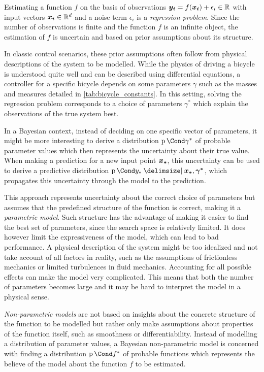 Estimating a function $f$ on the basis of observations $\bm{y_i} = f(\bm{x_i}) + \epsilon_i \in \mathbb{R}$ with input vectors $\bm{x_i} \in \mathbb{R}^d$ and a noise term $\epsilon_i$ is a \emph{regression problem}.
Since the number of observations is finite and the function $f$ is an infinite object, the estimation of $f$ is uncertain and based on prior assumptions about its structure.

In classic control scenarios, these prior assumptions often follow from physical descriptions of the system to be modelled.
While the physics of driving a bicycle is understood quite well and can be described using differential equations, a controller for a specific bicycle depends on some parameters $\gamma$ such as the masses and measures detailed in \cref{tab:bicycle_constants}.
In this setting, solving the regression problem corresponds to a choice of parameters $\gamma^\ast$ which explain the observations of the true system best.

In a Bayesian context, instead of deciding on one specific vector of parameters, it might be more interesting to derive a distribution $\Prob{\gamma^*}$ of probable parameter values which then represents the uncertainty about their true value.
When making a prediction for a new input point $\bm{x_\ast}$, this uncertainty can be used to derive a predictive distribution $\Prob{y_\ast \given \mat{x_\ast}, \mat{\gamma^\ast}}$, which propagates this uncertainty through the model to the prediction.

This approach represents uncertainty about the correct choice of parameters but assumes that the predefined structure of the function is correct, making it a \emph{parametric model}.
Such structure has the advantage of making it easier to find the best set of parameters, since the search space is relatively limited.
It does however limit the expressiveness of the model, which can lead to bad performance.
A physical description of the system might be too idealized and not take account of all factors in reality, such as the assumptions of frictionless mechanics or limited turbulences in fluid mechanics.
Accounting for all possible effects can make the model very complicated.
This means that both the number of parameters becomes large and it may be hard to interpret the model in a physical sense.

\emph{Non-parametric models} are not based on insights about the concrete structure of the function to be modelled but rather only make assumptions about properties of the function itself, such as smoothness or differentiability.
Instead of modelling a distribution of parameter values, a Bayesian non-parametric model is concerned with finding a distribution $\Prob{f^\ast}$ of probable functions which represents the believe of the model about the function $f$ to be estimated.

